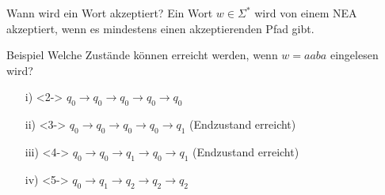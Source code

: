\begin{frame}{Wann wird ein Wort akzeptiert?}
    Ein Wort $w \in \Sigma^*$ wird von einem NEA akzeptiert, wenn es \alert{mindestens einen} akzeptierenden Pfad gibt.
    \begin{alertblock}{Beispiel}
        Welche Zustände können erreicht werden, wenn $w = aaba$ eingelesen wird?\\
        \vspace*{-5mm}
        \begin{center}
            \begin{enumerate}
                \item[i)]<2-> $q_0 \rightarrow q_0 \rightarrow q_0 \rightarrow q_0 \rightarrow q_0$
                \item[ii)]<3-> $q_0 \rightarrow q_0 \rightarrow q_0 \rightarrow q_0 \rightarrow q_1$ (Endzustand erreicht)
                \item[iii)]<4-> $q_0 \rightarrow q_0 \rightarrow q_1 \rightarrow q_0 \rightarrow q_1$ (Endzustand erreicht)
                \item[iv)]<5-> $q_0 \rightarrow q_1 \rightarrow q_2 \rightarrow q_2 \rightarrow q_2$
            \end{enumerate}
        \end{center}
    \end{alertblock}
\end{frame}